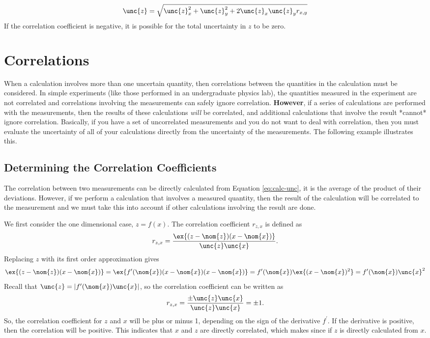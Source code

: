 \documentclass[letterpaper,10pt]{article}
\begin{document}
$$
\begin{aligned}
        \unc{z} = \sqrt{ \unc{z}_{x}^2 + \unc{z}_{y}^2 + 2\unc{z}_{x}\unc{z}_{y} r_{x,y} }
\end{aligned}
$$
If the correlation coefficient is negative, it is possible for the total uncertainty in $z$ to be zero.


\section{Correlations}
\label{sec-correlations}

When a calculation involves more than one uncertain quantity, then correlations
between the quantities in the calculation must be considered. In simple
experiments (like those performed in an undergraduate physics lab), the
quantities measured in the experiment are not correlated and correlations
involving the measurements can safely ignore correlation. \textbf{However}, if a
series of calculations are performed with the measurements, then the results of
these calculations \emph{will} be correlated, and additional calculations that
involve the result *cannot* ignore correlation. Basically, if you have a set of
uncorrelated measurements and you do not want to deal with correlation, then
you must evaluate the uncertainty of all of your calculations directly from the
uncertainty of the measurements. The following example illustrates this.


\subsection{Determining the Correlation Coefficients}
\label{sec-determining-the-correlation-coefficients}

The correlation between two measurements can be directly calculated from Equation \ref{eq:calc-unc}, it is the average of the product of their deviations. However, if we perform a calculation that involves a measured quantity, then
the result of the calculation will be correlated to the measurement and we must take this into account if other calculations involving the result are done.

We first consider the one dimensional case, $z = f(x)$. The correlation coefficient $r_{z,x}$ is defined as
$$
r_{z,x} = \frac{ \ex{ (z-\nom{z})(x-\nom{x}) } }{\unc{z}\unc{x}}.
$$
Replacing $z$ with its first order approximation gives
$$
\ex{ (z-\nom{z})(x-\nom{x})}  = \ex{ f^{\prime}(\nom{x})(x-\nom{x})(x-\nom{x}) } = f^{\prime}(\nom{x})\ex{ (x-\nom{x})^2 } = f^{\prime}(\nom{x})\unc{x}^2
$$
Recall that $\unc{z} = |f^{\prime}(\nom{x})\unc{x}|$, so the correlation coefficient can be written as 
$$
r_{z,x} = \frac{ \pm\unc{z} \unc{x} }{\unc{z}\unc{x}} = \pm 1.
$$
So, the correlation coefficient for $z$ and $x$ will be plus or minus 1, depending on the sign of the derivative $f^{\prime}$. If the derivative is positive, then the correlation will be positive. This
indicates that $x$ and $z$ are directly correlated, which makes since if $z$ is directly calculated from $x$.
\end{document}
